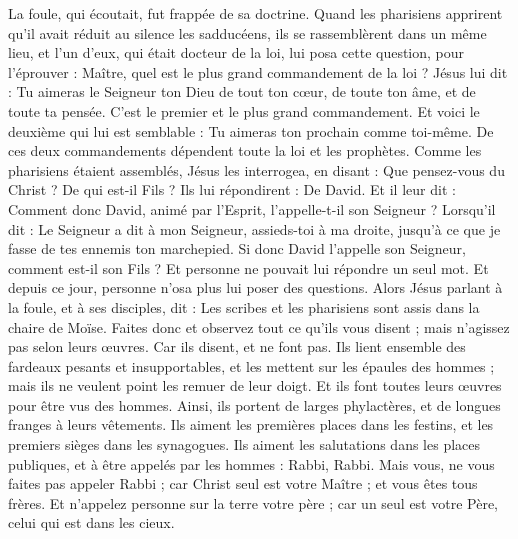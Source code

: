 \begin{multicols}{2}
La foule, qui écoutait, fut frappée de sa doctrine.
Quand les pharisiens apprirent qu'il avait réduit au silence les sadducéens, ils se rassemblèrent dans un même lieu,
et l'un d'eux, qui était docteur de la loi, lui posa cette question, pour l'éprouver :
Maître, quel est le plus grand commandement de la loi ?
Jésus lui dit : Tu aimeras le Seigneur ton Dieu de tout ton cœur, de toute ton âme, et de toute ta pensée.
C’est le premier et le plus grand commandement.
Et voici le deuxième qui lui est semblable : Tu aimeras ton prochain comme toi-même.
De ces deux commandements dépendent toute la loi et les prophètes.
Comme les pharisiens étaient assemblés, Jésus les interrogea,
en disant : Que pensez-vous du Christ ? De qui est-il Fils ? Ils lui répondirent : De David.
Et il leur dit : Comment donc David, animé par l'Esprit, l'appelle-t-il son Seigneur ? Lorsqu’il dit :
Le Seigneur a dit à mon Seigneur, assieds-toi à ma droite, jusqu'à ce que je fasse de tes ennemis ton marchepied{}.
Si donc David l'appelle son Seigneur, comment est-il son Fils ?
Et personne ne pouvait lui répondre un seul mot. Et depuis ce jour, personne n'osa plus lui poser des questions.
\VerseOne{}Alors Jésus parlant à la foule, et à ses disciples,
dit : Les scribes et les pharisiens sont assis dans la chaire de Moïse.
Faites donc et observez tout ce qu’ils vous disent ; mais n’agissez pas selon leurs œuvres. Car ils disent, et ne font pas.
Ils lient ensemble des fardeaux pesants et insupportables, et les mettent sur les épaules des hommes ; mais ils ne veulent point les remuer de leur doigt.
Et ils font toutes leurs œuvres pour être vus des hommes. Ainsi, ils portent de larges phylactères, et de longues franges à leurs vêtements.
Ils aiment les premières places dans les festins, et les premiers sièges dans les synagogues.
Ils aiment les salutations dans les places publiques, et à être appelés par les hommes : Rabbi, Rabbi.
Mais vous, ne vous faites pas appeler Rabbi ; car Christ seul est votre Maître ; et vous êtes tous frères.
Et n'appelez personne sur la terre votre père ; car un seul est votre Père, celui qui est dans les cieux.

\end{multicols}
